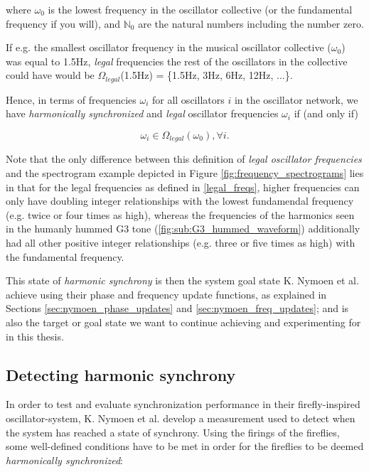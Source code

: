 where $\omega_{0}$ is the lowest frequency in the oscillator collective (or the fundamental frequency if you will), and $\mathbb{N}_0$ are the natural numbers including the number zero. \nl

If e.g. the smallest oscillator frequency in the musical oscillator collective ($\omega_0$) was equal to 1.5Hz, \textit{legal} frequencies the rest of the oscillators in the collective could have would be $\Omega_{legal}$(1.5Hz) = \{1.5Hz, 3Hz, 6Hz, 12Hz, ...\}.

Hence, in terms of frequencies $\omega_i$ for all oscillators $i$ in the oscillator network, we have \textit{harmonically synchronized} and \textit{legal} oscillator frequencies $\omega_i$ if (and only if)

\begin{equation}\label{synced_freqs}
\omega_i \in \Omega_{legal}(\omega_0) , \forall i.
\end{equation} \nl

Note that the only difference between this definition of \textit{legal oscillator frequencies} and the spectrogram example depicted in Figure \ref{fig:frequency_spectrograms} lies in that for the legal frequencies as defined in \eqref{legal_freqs}, higher frequencies can only have doubling integer relationships with the lowest fundamendal frequency (e.g. twice or four times as high), whereas the frequencies of the harmonics seen in the humanly hummed G3 tone (\ref{fig:sub:G3_hummed_waveform}) additionally had all other positive integer relationships (e.g. three or five times as high) with the fundamental frequency.

This state of \textit{harmonic synchrony} is then the system goal state K. Nymoen et al. achieve using their phase and frequency update functions, as explained in Sections \ref{sec:nymoen_phase_updates} and \ref{sec:nymoen_freq_updates}; and is also the target or goal state we want to continue achieving and experimenting for in this thesis.

	\subsection{Detecting harmonic synchrony}
	\label{baseline:subsec:detecting_harmonic_sync}
	In order to test and evaluate synchronization performance in their firefly-inspired oscillator-system, K. Nymoen et al. \cite{nymoen_synch} develop a measurement used to detect when the system has reached a state of synchrony. Using the firings of the fireflies, some well-defined conditions have to be met in order for the fireflies to be deemed \textit{harmonically synchronized}: \nl
	
